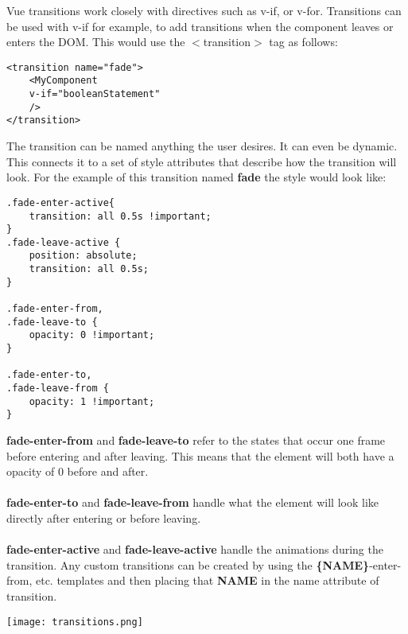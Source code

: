 \documentclass[portfolio.tex]{subfiles}
\begin{document}
			Vue transitions work closely with directives such as v-if, or v-for. Transitions can be used with v-if for example, to add transitions when the component leaves or enters the DOM. This would use the $<$transition$>$ tag as follows:\\

			\begin{lstlisting}
<transition name="fade">
	<MyComponent
	v-if="booleanStatement"
	/>
</transition>
			\end{lstlisting}
		\bigbreak

		The transition can be named anything the user desires. It can even be dynamic. This connects it to a set of style attributes that describe how the transition will look. For the example of this transition named \textbf{fade} the style would look like:\\

		\begin{lstlisting}
.fade-enter-active{
	transition: all 0.5s !important;
}
.fade-leave-active {
	position: absolute;
	transition: all 0.5s;
}

.fade-enter-from,
.fade-leave-to {
	opacity: 0 !important;
}

.fade-enter-to,
.fade-leave-from {
	opacity: 1 !important;
}

		\end{lstlisting}

			\bigbreak
			\noindent
			\textbf{fade-enter-from} and \textbf{fade-leave-to} refer to the states that occur one frame before entering and after leaving. This means that the element will both have a opacity of 0 before and after.\\
			\\
			\textbf{fade-enter-to} and \textbf{fade-leave-from} handle what the element will look like directly after entering or before leaving. \\
			\\
			\textbf{fade-enter-active} and \textbf{fade-leave-active} handle the animations during the transition. Any custom transitions can be created by using the \textbf{\{NAME\}}-enter-from, etc. templates and then placing that \textbf{NAME} in the name attribute of transition.\\

			\begin{center}
				\texttt{[image: transitions.png]}\\
				\autocite{vue-transitions}
			\end{center}
\end{document}
